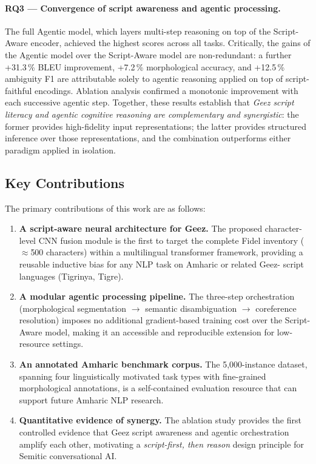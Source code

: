 \paragraph{RQ3 — Convergence of script awareness and agentic processing.}
The full Agentic model, which layers multi-step reasoning on top of the Script-Aware encoder,
achieved the highest scores across all tasks.  Critically, the gains of the Agentic model over
the Script-Aware model are non-redundant: a further +31.3\,\% BLEU improvement, +7.2\,\%
morphological accuracy, and +12.5\,\% ambiguity F1 are attributable solely to agentic
reasoning applied on top of script-faithful encodings.  Ablation analysis confirmed a
monotonic improvement with each successive agentic step.  Together, these results establish
that \emph{Ge\textquotesingle ez script literacy and agentic cognitive reasoning are
complementary and synergistic}: the former provides high-fidelity input representations; the
latter provides structured inference over those representations, and the combination
outperforms either paradigm applied in isolation.

\subsection*{Key Contributions}

The primary contributions of this work are as follows:

\begin{enumerate}
  \item \textbf{A script-aware neural architecture for Ge\textquotesingle ez.}  The proposed
        character-level CNN fusion module is the first to target the complete Fidel inventory
        ($\approx$500 characters) within a multilingual transformer framework, providing a
        reusable inductive bias for any NLP task on Amharic or related Ge\textquotesingle ez-%
        script languages (Tigrinya, Tigre).

  \item \textbf{A modular agentic processing pipeline.}  The three-step orchestration
        (morphological segmentation $\to$ semantic disambiguation $\to$ coreference resolution)
        imposes no additional gradient-based training cost over the Script-Aware model, making
        it an accessible and reproducible extension for low-resource settings.

  \item \textbf{An annotated Amharic benchmark corpus.}  The 5{,}000-instance dataset,
        spanning four linguistically motivated task types with fine-grained morphological
        annotations, is a self-contained evaluation resource that can support future Amharic
        NLP research.

  \item \textbf{Quantitative evidence of synergy.}  The ablation study provides the first
        controlled evidence that Ge\textquotesingle ez script awareness and agentic
        orchestration amplify each other, motivating a \emph{script-first, then reason}
        design principle for Semitic conversational AI.
\end{enumerate}

